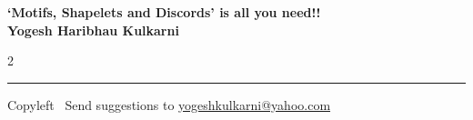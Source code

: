 \documentclass[8pt,landscape]{article}
\begin{document}
\footnotesize


\begin{center}
\Large{\textbf{`Motifs, Shapelets and Discords' is all you need!!\\ Yogesh Haribhau Kulkarni}}  
\end{center}

\begin{multicols}{2}

\end{multicols}

\rule{\linewidth}{0.25pt}
\scriptsize
Copyleft \textcopyleft\  Send suggestions to 
\href{http://www.yogeshkulkarni.com}{yogeshkulkarni@yahoo.com}
\end{document}
